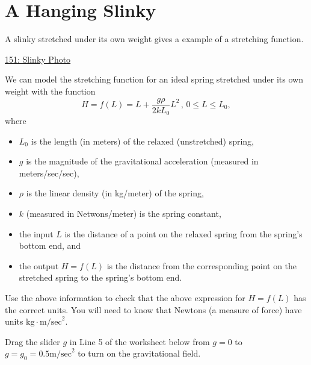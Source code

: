 \documentclass{ximera}
\begin{document}
\section{A Hanging Slinky}
\begin{example} \label{Ex:MDH4955gfg}
A slinky stretched under its own weight gives a example of a stretching function. 


\begin{onlineOnly}
    \begin{center}
\end{center}
\end{onlineOnly}

\href{https://www.desmos.com/calculator/zqjjgael5j}{151: Slinky Photo}

We can model the stretching function for an ideal spring stretched under its own weight with the function
\[
 H = f(L) = L + \frac{g\rho}{2kL_0}L^2 \, , \, 0\leq L \leq L_0 ,
\]
where
\begin{itemize}
\item $L_0$ is the length (in meters) of the relaxed (unstretched) spring, 

\item $g$ is the magnitude of the gravitational acceleration (measured in meters/sec/sec),

\item $\rho$ is the linear density (in kg/meter) of the spring,

\item $k$ (measured in Netwons/meter) is the spring constant,

\item the input $L$ is the distance of a point on the relaxed spring from the spring's bottom end, and

\item the output $H=f(L)$ is the distance from the corresponding point on the stretched spring to the spring's bottom end.

\end{itemize}

\begin{freeResponse}
Use the above information to check that the above expression for $H=f(L)$ has the correct units. You will need to know that Newtons (a measure of force) have units $\text{kg}\cdot \text{m/sec}^2$. 
\end{freeResponse}



Drag the slider $g$ in Line 5 of the worksheet below from $g=0$ to $g=g_0 = 0.5 \text{m/sec}^2$ to turn on the gravitational field. 


\end{example}
\end{document}
